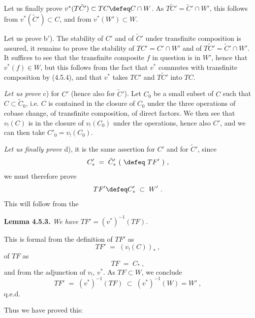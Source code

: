 Let us finally prove $v^*(T\tilde{C}') \subset TC \defeq C \cap W$. As $T\tilde{C}' = \tilde{C}' \cap W'$, this follows from $v^*(\tilde{C}') \subset C$, and from $v^*(W') \subset W$.

Let us prove b$'$). The stability of $C'$ and of $\tilde{C}'$ under transfinite composition is assured, it remains to prove the stability of $TC' = C' \cap W'$ and of $T\tilde{C}' = \tilde{C}' \cap W'$. It suffices to see that the transfinite composite $f$ in question is in $W'$, hence that $v^*(f) \in W$, but this follows from the fact that $v^*$ commutes with transfinite composition by (4.5.4), and that $v^*$ takes $TC'$ and $T\tilde{C}'$ into $TC$.

\textit{Let us prove} c) for $C'$ (hence also for $\tilde{C}'$). Let $C_0$ be a small subset of $C$ such that $C \subset \tilde{C}_0$, i.e. $C$ is contained in the closure of $C_0$ under the three operations of cobase change, of transfinite composition, of direct factors. We then see that $v_!(C)$ is in the closure of $v_!(C_0)$ under the operations, hence also $C'$, and we can then take $C'_0 = v_!(C_0)$.

\textit{Let us finally prove} d), it is the same assertion for $C'$ and for $\tilde{C}'$, since
\[
C'_* \;=\; \tilde{C}'_*\ (\ \defeq\ TF'\ )\ ,
\]
we must therefore prove
\[
TF' \defeq C'_* \;\subset\; W'\ .
\]
This will follow from the

\textbf{Lemma 4.5.3.} \textit{We have $TF' = (v^*)^{-1}(TF)$.}

This is formal from the definition of $TF'$ as
\[
TF' \;=\; (v_!(C))_*\ ,
\]
of $TF$ as
\[
TF \;=\; C_*\ ,
\]
and from the adjunction of $v_!$, $v^*$. As $TF \subset W$, we conclude
\[
TF' \;=\; (v^*)^{-1}(TF) \;\subset\; (v^*)^{-1}(W) = W'\ ,
\]
q.e.d.

Thus we have proved this:

